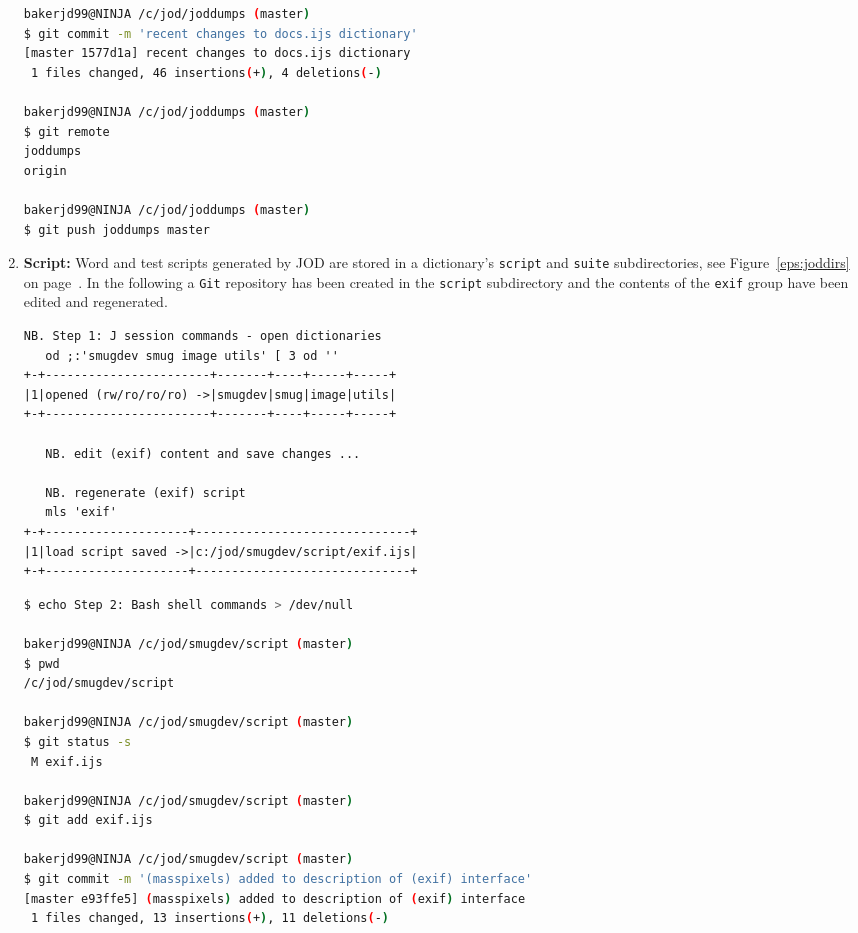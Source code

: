\begin{enumerate}
\begin{lstlisting}[language=bash,frame=single,framerule=0pt
,basicstyle=\ttfamily\footnotesize,backgroundcolor=\color{CodeBackGround}]
bakerjd99@NINJA /c/jod/joddumps (master)
$ git commit -m 'recent changes to docs.ijs dictionary'
[master 1577d1a] recent changes to docs.ijs dictionary
 1 files changed, 46 insertions(+), 4 deletions(-)
 
bakerjd99@NINJA /c/jod/joddumps (master) 
$ git remote
joddumps
origin

bakerjd99@NINJA /c/jod/joddumps (master) 
$ git push joddumps master 
\end{lstlisting}

\item \textbf{Script:} Word and test scripts generated by JOD are stored
in a dictionary's  \texttt{script} and \texttt{suite} subdirectories, see Figure~\ref{eps:joddirs} on page~\pageref{eps:joddirs}.
In the following a \texttt{Git} repository has been created in the \texttt{script} subdirectory
and the contents of the \texttt{exif} group have been edited and regenerated.

\begin{lstlisting}[frame=single,framerule=0pt,basicstyle=\ttfamily\footnotesize]
   NB. Step 1: J session commands - open dictionaries
   od ;:'smugdev smug image utils' [ 3 od ''
+-+-----------------------+-------+----+-----+-----+
|1|opened (rw/ro/ro/ro) ->|smugdev|smug|image|utils|
+-+-----------------------+-------+----+-----+-----+

   NB. edit (exif) content and save changes ...
   
   NB. regenerate (exif) script
   mls 'exif'
+-+--------------------+------------------------------+
|1|load script saved ->|c:/jod/smugdev/script/exif.ijs|
+-+--------------------+------------------------------+
\end{lstlisting}

\begin{lstlisting}[language=bash,frame=single,framerule=0pt
,basicstyle=\ttfamily\footnotesize,backgroundcolor=\color{CodeBackGround}]
$ echo Step 2: Bash shell commands > /dev/null

bakerjd99@NINJA /c/jod/smugdev/script (master)
$ pwd
/c/jod/smugdev/script

bakerjd99@NINJA /c/jod/smugdev/script (master)
$ git status -s
 M exif.ijs

bakerjd99@NINJA /c/jod/smugdev/script (master)
$ git add exif.ijs

bakerjd99@NINJA /c/jod/smugdev/script (master)
$ git commit -m '(masspixels) added to description of (exif) interface'
[master e93ffe5] (masspixels) added to description of (exif) interface
 1 files changed, 13 insertions(+), 11 deletions(-)
\end{lstlisting}


\end{enumerate}
